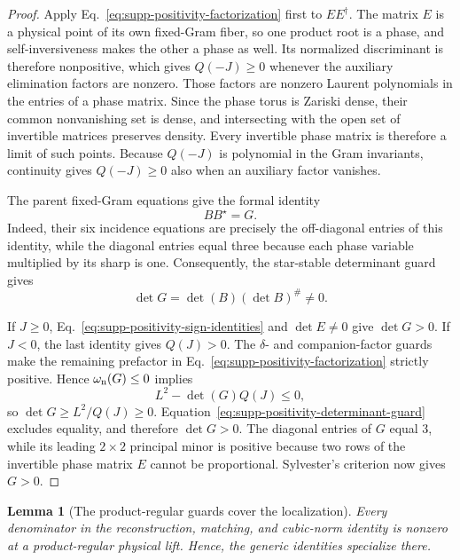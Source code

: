 \documentclass[aps,prx,reprint,nofootinbib,twoside,superscriptaddress,longbibliography,floatfix]{revtex4-2}
\newtheorem{lemma}[theorem]{Lemma}
\theoremstyle{definition}
\begin{document}
\begin{proof}
Apply Eq.~\eqref{eq:supp-positivity-factorization} first to $EE^\dagger$.  The matrix $E$ is a physical point of its own fixed-Gram fiber, so one product root is a phase, and self-inversiveness makes the other a phase as well. Its normalized discriminant is therefore nonpositive, which gives $Q(-J)\geq0$ whenever the auxiliary elimination factors are nonzero. Those factors are nonzero Laurent polynomials in the entries of a phase matrix. Since the phase torus is Zariski dense, their common nonvanishing set is dense, and intersecting with the open set of invertible matrices preserves density. Every invertible phase matrix is therefore a limit of such points. Because $Q(-J)$ is polynomial in the Gram invariants, continuity gives $Q(-J)\geq0$ also when an auxiliary factor vanishes.

The parent fixed-Gram equations give the formal identity
\begin{equation}
BB^\star=G.
\label{eq:supp-positivity-formal-gram}
\end{equation}
Indeed, their six incidence equations are precisely the off-diagonal entries of this identity, while the diagonal entries equal three because each phase variable multiplied by its sharp is one. Consequently, the star-stable determinant guard gives
\begin{equation}
\det G=\det(B)(\det B)^\#\ne0.
\label{eq:supp-positivity-determinant-guard}
\end{equation}

If $J\geq0$, Eq.~\eqref{eq:supp-positivity-sign-identities} and $\det E\ne0$ give $\det G>0$. If $J<0$, the last identity gives $Q(J)>0$. The $\delta$- and companion-factor guards make the remaining prefactor in Eq.~\eqref{eq:supp-positivity-factorization} strictly positive. Hence $\omega_{\rm n}(G)\leq0$ implies
\begin{equation}
L^2-\det(G)Q(J)\leq0,
\end{equation}
so $\det G\geq L^2/Q(J)\geq0$. Equation~\eqref{eq:supp-positivity-determinant-guard} excludes equality, and therefore $\det G>0$. The diagonal entries of $G$ equal $3$, while its leading $2\times2$ principal minor is positive because two rows of the invertible phase matrix $E$ cannot be proportional.  Sylvester's criterion now gives $G>0$.
\end{proof}


\begin{lemma}[The product-regular guards cover the localization]
\label{lem:supp-regular-localization}
{Every denominator in the reconstruction, matching, and cubic-norm identity is nonzero at a product-regular physical lift. Hence, the generic identities specialize there.}
\end{lemma}
\end{document}
